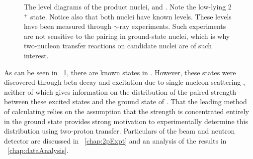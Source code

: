 \begin{figure}[!htbp]
\captionsetup[subfloat]{labelformat=empty}
\centering
{}
\hspace{2cm}
\caption[Level diagram of  and .]{The level diagrams of the product nuclei,  and .  Note the low-lying 2$^+$ state.  Notice also that both nuclei have known \zp levels.  These levels have been measured through $\gamma$-ray experiments.  Such experiments are not sensitive to the pairing in ground-state nuclei, which is why two-nucleon transfer reactions on \zvbb candidate nuclei are of such interest.}
\label{fig:levelDiagrams}
\end{figure}
As can be seen in {\fig}~\ref{fig:levelDiagrams}, there are known \zp states in \SeProducts.  However, these states were discovered through beta decay and excitation due to single-nucleon scattering \citep{NNDC}, neither of which gives information on the distribution of the paired \zp strength between these excited states and the ground state of \GeTargets.  That the leading method of calculating \NME relies on the assumption that the \zp strength is concentrated entirely in the ground state provides strong motivation to experimentally determine this distribution using two-proton transfer.  Particulars of the beam and neutron detector are discussed in {\chap}~\ref{chap:2pExpt} and an analysis of the results in {\chap}~\ref{chap:dataAnalysis}.
%
% 
% 
